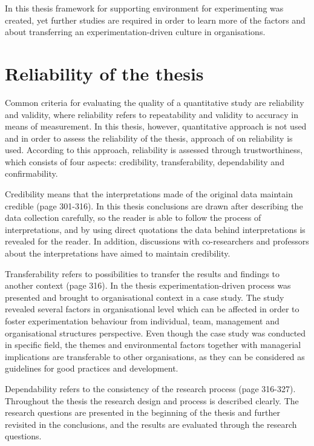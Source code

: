 In this thesis framework for supporting environment for experimenting was created, yet further studies are required in order to learn more of the factors and about transferring an experimentation-driven culture in organisations. 

\section{Reliability of the thesis}
Common criteria for evaluating the quality of a quantitative study are reliability and validity, where reliability refers to repeatability and validity to accuracy in means of measurement. In this thesis, however, quantitative approach is not used and in order to assess the reliability of the thesis, approach of \citet{lincoln1985naturalistic} on reliability is used. According to this approach, reliability is assessed through trustworthiness, which consists of four aspects: credibility, transferability, dependability and confirmability. 

Credibility means that the interpretations made of the original data maintain credible \citep{lincoln1985naturalistic} (page 301-316). In this thesis conclusions are drawn after describing the data collection carefully, so the reader is able to follow the process of interpretations, and by using direct quotations the data behind interpretations is revealed for the reader. In addition, discussions with co-researchers and professors about the interpretations have aimed to maintain credibility. 

Transferability refers to possibilities to transfer the results and findings to another context \citep{lincoln1985naturalistic} (page 316). In the thesis experimentation-driven process was presented and brought to organisational context in a case study. The study revealed several factors in organisational level which can be affected in order to foster experimentation behaviour from individual, team, management and organisational structures perspective. Even though the case study was conducted in specific field, the themes and environmental factors together with managerial implications are transferable to other organisations, as they can be considered as guidelines for good practices and development. 

Dependability refers to the consistency of the research process \citep{lincoln1985naturalistic} (page 316-327). Throughout the thesis the research design and process is described clearly. The research questions are presented in the beginning of the thesis and further revisited in the conclusions, and the results are evaluated through the research questions.

